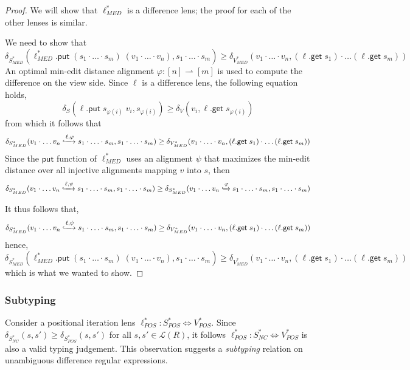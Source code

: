 \documentclass[acmsmall,review,anonymous]{acmart}\settopmatter{printfolios=true,printccs=false,printacmref=false}
\theoremstyle{definition}
\newcommand{\kw}[1]{\ensuremath{\mathsf{#1}}\xspace}
\newcommand{\get}{\ensuremath{\kw{get}}\xspace}
\newcommand{\pput}{\ensuremath{\kw{put}}\xspace}
\begin{document}
\begin{proof}
We will show that $\ell^*_{MED}$ is a difference lens; the proof for each of the other lenses is similar.

We need to show that
$$\delta_{S^*_{MED}}(\ell^*_{MED}.\pput \; (s_1 \cdot \ldots \cdot s_m) \; (v_1 \cdot \ldots \cdot v_n), s_1 \cdot \ldots \cdot s_m) \geq \delta_{V^*_{MED}}(v_1 \cdot \ldots \cdot v_n, (\ell.\get \; s_1) \cdot \ldots (\ell.\get \; s_m))$$
An optimal min-edit distance alignment $\varphi : [n] \rightharpoonup [m]$ is used to compute the difference on the view side. Since $\ell$ is a difference lens, the following equation holds,
$$\delta_S(\ell.\pput \; s_{\varphi(i)} \; v_i, s_{\varphi(i)}) \geq \delta_V(v_i, \ell.\get \; s_{\varphi(i)})$$
from which it follows that
$$\delta_{S^*_{MED}}(v_1 \cdot \ldots v_n \xhookrightarrow{\ell, \varphi} s_1 \cdot \ldots \cdot s_m, s_1 \cdot \ldots \cdot s_m) \geq \delta_{V^*_{MED}}(v_1 \cdot \ldots \cdot v_n, (\ell.\get \; s_1) \cdot \ldots (\ell.\get \; s_m))$$
Since the \pput function of $\ell^*_{MED}$ uses an alignment $\psi$ that maximizes the min-edit distance over all injective alignments mapping $v$ into $s$, then
$$\delta_{S^*_{MED}}(v_1 \cdot \ldots v_n \xhookrightarrow{\ell, \psi} s_1 \cdot \ldots \cdot s_m, s_1 \cdot \ldots \cdot s_m) \geq \delta_{S^*_{MED}}(v_1 \cdot \ldots v_n \xhookrightarrow{\varphi} s_1 \cdot \ldots \cdot s_m, s_1 \cdot \ldots \cdot s_m)$$

It thus follows that,
$$\delta_{S^*_{MED}}(v_1 \cdot \ldots v_n \xhookrightarrow{\ell, \psi} s_1 \cdot \ldots \cdot s_m, s_1 \cdot \ldots \cdot s_m) \geq \delta_{V^*_{MED}}(v_1 \cdot \ldots \cdot v_n, (\ell.\get \; s_1) \cdot \ldots (\ell.\get \; s_m))$$
hence,
$$\delta_{S^*_{MED}}(\ell^*_{MED}.\pput \; (s_1 \cdot \ldots \cdot s_m) \; (v_1 \cdot \ldots \cdot v_n), s_1 \cdot \ldots \cdot s_m) \geq \delta_{V^*_{MED}}(v_1 \cdot \ldots \cdot v_n, (\ell.\get \; s_1) \cdot \ldots (\ell.\get \; s_m))$$
which is what we wanted to show.
\end{proof}
\subsubsection{Subtyping}
Consider a positional iteration lens $\ell^*_{POS} : S^*_{POS} \Leftrightarrow V^*_{POS}$. Since $\delta_{S^*_{NC}}(s, s') \geq \delta_{S^*_{POS}}(s, s')$ for all $s, s' \in \mathcal{L}(R)$, it follows $\ell^*_{POS} : S^*_{NC} \Leftrightarrow V^*_{POS}$ is also a valid typing judgement. This observation suggests a {\em subtyping} relation on unambiguous difference regular expressions.
\end{document}
